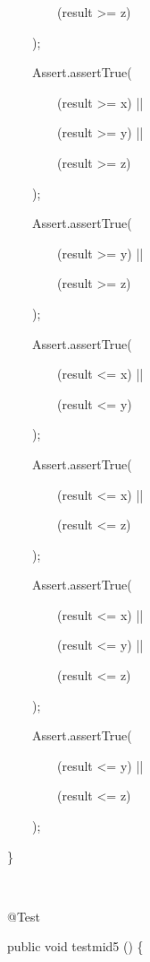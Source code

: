 \documentclass{article}
\newenvironment{tmindent}{\begin{tmparmod}{1.5em}{0pt}{0pt} }{\end{tmparmod}}
\newenvironment{tmparmod}[3]{\begin{list}{}{\setlength{\topsep}{0pt}\setlength{\leftmargin}{#1}\setlength{\rightmargin}{#2}\setlength{\parindent}{#3}\setlength{\listparindent}{\parindent}\setlength{\itemindent}{\parindent}\setlength{\parsep}{\parskip}} \item[]}{\end{list}}
\newenvironment{tmparsep}[1]{\begingroup\setlength{\parskip}{#1}}{\endgroup}
\begin{document}
\begin{example}
\begin{tmindent}
\begin{tmparsep}{0em}
      \ \ \ \ \ \ \ \ \ \ \ (result >= z)
      
      \ \ \ \ \ \ \ );
      
      \ \ \ \ \ \ \ Assert.assertTrue(
      
      \ \ \ \ \ \ \ \ \ \ \ (result >= x) ||
      
      \ \ \ \ \ \ \ \ \ \ \ (result >= y) ||
      
      \ \ \ \ \ \ \ \ \ \ \ (result >= z)
      
      \ \ \ \ \ \ \ );
      
      \ \ \ \ \ \ \ Assert.assertTrue(
      
      \ \ \ \ \ \ \ \ \ \ \ (result >= y) ||
      
      \ \ \ \ \ \ \ \ \ \ \ (result >= z)
      
      \ \ \ \ \ \ \ );
      
      \ \ \ \ \ \ \ Assert.assertTrue(
      
      \ \ \ \ \ \ \ \ \ \ \ (result <= x) ||
      
      \ \ \ \ \ \ \ \ \ \ \ (result <= y)
      
      \ \ \ \ \ \ \ );
      
      \ \ \ \ \ \ \ Assert.assertTrue(
      
      \ \ \ \ \ \ \ \ \ \ \ (result <= x) ||
      
      \ \ \ \ \ \ \ \ \ \ \ (result <= z)
      
      \ \ \ \ \ \ \ );
      
      \ \ \ \ \ \ \ Assert.assertTrue(
      
      \ \ \ \ \ \ \ \ \ \ \ (result <= x) ||
      
      \ \ \ \ \ \ \ \ \ \ \ (result <= y) ||
      
      \ \ \ \ \ \ \ \ \ \ \ (result <= z)
      
      \ \ \ \ \ \ \ );
      
      \ \ \ \ \ \ \ Assert.assertTrue(
      
      \ \ \ \ \ \ \ \ \ \ \ (result <= y) ||
      
      \ \ \ \ \ \ \ \ \ \ \ (result <= z)
      
      \ \ \ \ \ \ \ );
      
      \ \ \ \}
      
      \ \ \
      
      \ \ \ @Test
      
      \ \ \ public void testmid5 () \{
      

\end{tmparsep}
\end{tmindent}
\end{example}
\end{document}
